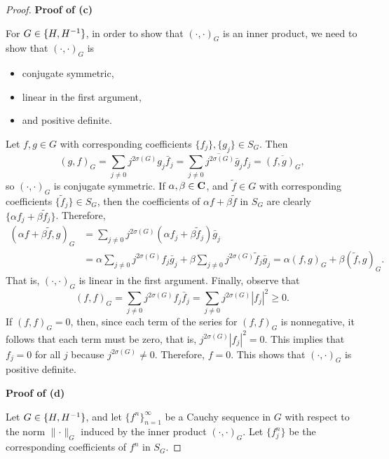 \documentclass{homework}
\begin{document}
\begin{arabicparts}
\begin{proof}
			\textbf{Proof of (c)}
			
			For $G \in \{H,{H^{-1}}\}$, in order to show that $(\cdot,\cdot)_G$ is an inner product, we need to show that $(\cdot,\cdot)_G$ is
			\begin{itemize}
				\item conjugate symmetric,
				\item linear in the first argument,
				\item and positive definite.
			\end{itemize}
			
			Let $f,g \in G$ with corresponding coefficients $\{f_j\}, \{g_j\} \in S_G$. Then
			\begin{equation}
				(g,f)_G = \sum_{j\ne0}j^{2\sigma(G)}g_j\bar{f}_j = \overline{\sum_{j\ne0}j^{2\sigma(G)}\bar{g}_jf_j} = \overline{(f,g)_G},
			\end{equation}
			so $(\cdot,\cdot)_G$ is conjugate symmetric. If $\alpha,\beta \in \textbf{C}$, and $\tilde{f} \in G$ with corresponding coefficients $\{\tilde{f}_j\} \in S_G$, then the coefficients of $\alpha f + \beta \tilde{f}$ in $S_G$ are clearly $\{\alpha f_j + \beta \tilde{f}_j\}$. Therefore,
			\begin{align}
				(\alpha f + \beta \tilde{f}, g)_G &= \sum_{j\ne 0}j^{2\sigma(G)}(\alpha f_j + \beta \tilde{f}_j)\bar{g}_j \\
				&= \alpha \sum_{j\ne0}j^{2\sigma(G)}f_j\bar{g}_j + \beta\sum_{j\ne 0}j^{2\sigma(G)}\tilde{f}_j\bar{g}_j = \alpha(f,g)_G + \beta(\tilde{f},g)_G.
			\end{align}
			That is, $(\cdot,\cdot)_G$ is linear in the first argument. Finally, observe that
			\begin{equation}
				(f,f)_G = \sum_{j\ne 0} j^{2\sigma(G)}f_j\bar{f}_j = \sum_{j\ne0}j^{2\sigma(G)} |f_j|^2 \ge 0.
			\end{equation}
			If $(f,f)_G = 0$, then, since each term of the series for $(f,f)_G$ is nonnegative, it follows that each term must be zero, that is, $j^{2\sigma(G)}|f_j|^2 = 0$. This implies that $f_j = 0$ for all $j$ because $j^{2\sigma(G)} \ne 0$. Therefore, $f = 0$. This shows that $(\cdot,\cdot)_G$ is positive definite.
			
			\textbf{Proof of (d)}
			
			Let $G \in \{H,{H^{-1}}\}$, and let $\{f^n\}_{n=1}^\infty$ be a Cauchy sequence in $G$ with respect to the norm $\lVert \cdot \rVert_G$ induced by the inner product $(\cdot,\cdot)_G$. Let $\{f^n_j\}$ be the corresponding coefficients of $f^n$ in $S_G$.
			

\end{proof}
\end{arabicparts}
\end{document}
